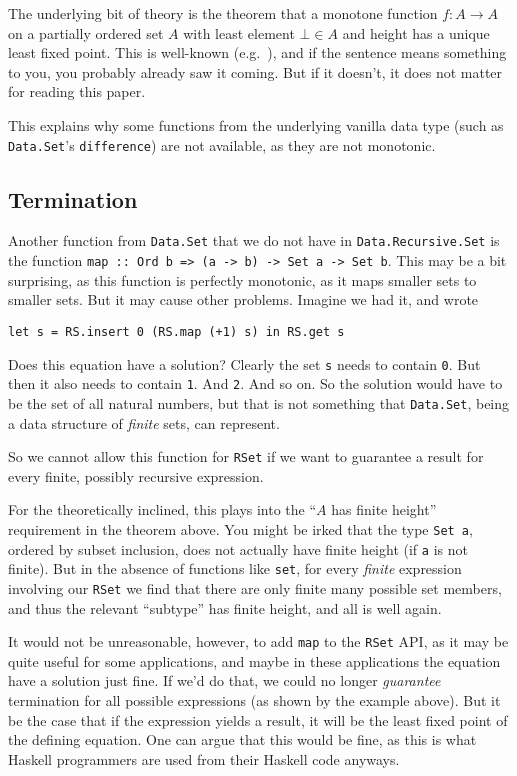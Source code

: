 \documentclass[manuscript,screen,acmsmall]{acmart}
\begin{document}
The underlying bit of theory is the theorem that a monotone function $f : A \to A$ on a partially ordered set $A$ with least element $\bot \in A$ and height has a unique least fixed point. This is well-known (e.g.\ \citet{lazyleast}), and if the sentence means something to you, you probably already saw it coming. But if it doesn't, it does not matter for reading this paper.

This explains why some functions from the underlying vanilla data type (such as \verb|Data.Set|'s \verb|difference|) are not available, as they are not monotonic.

\subsection{Termination}

Another function from \verb|Data.Set| that we do not have in \verb|Data.Recursive.Set| is the function \verb|map :: Ord b => (a -> b) -> Set a -> Set b|. This may be a bit surprising, as this function is perfectly monotonic, as it maps smaller sets to smaller sets. But it may cause other problems. Imagine we had it, and wrote
\begin{verbatim}
let s = RS.insert 0 (RS.map (+1) s) in RS.get s
\end{verbatim}
Does this equation have a solution? Clearly the set \verb|s| needs to contain \verb|0|. But then it also needs to contain \verb|1|. And \verb|2|. And so on. So the solution would have to be the set of all natural numbers, but that is not something that \verb|Data.Set|, being a data structure of \emph{finite} sets, can represent.

So we cannot allow this function for \verb|RSet| if we want to guarantee a result for every finite, possibly recursive expression.

For the theoretically inclined, this plays into the “$A$ has finite height” requirement in the theorem above. You might be irked that the type \verb|Set a|, ordered by subset inclusion, does not actually have finite height (if \verb|a| is not finite). But in the absence of functions like \verb|set|, for every \emph{finite} expression involving our \verb|RSet| we find that there are only finite many possible set members, and thus the relevant “subtype” has finite height, and all is well again.

It would not be unreasonable, however, to add \verb|map| to the \verb|RSet| API, as it may be quite useful for some applications, and maybe in these applications the equation have a solution just fine. If we'd do that, we could no longer \emph{guarantee} termination for all possible expressions (as shown by the example above). But it be the case that if the expression yields a result, it will be the least fixed point of the defining equation. One can argue that this would be fine, as this is what Haskell programmers are used from their Haskell code anyways.
\end{document}

